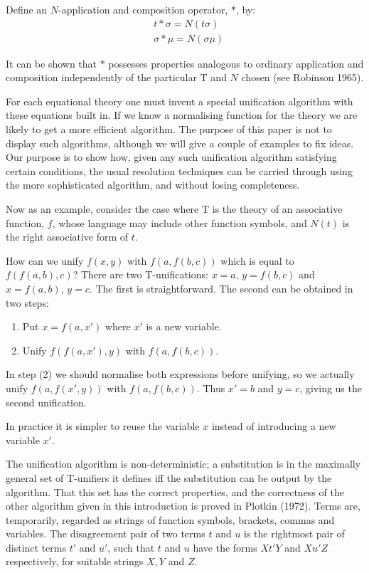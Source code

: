 \documentclass[letterpaper]{report}
\begin{document}
Define an $N$-application and composition operator, $\ast$, by:
\begin{align*}
&t\ast\sigma=N(t\sigma)\\
&\sigma\ast\mu=N(\sigma\mu)
\end{align*}

It can be shown that $\ast$ possesses properties analogous to ordinary
application and composition independently of the particular $\mathrm{T}$ and
$N$ chosen (see Robinson 1965).

For each equational theory one must invent a special unification
algorithm with these equations built in. If we know a normalising
function for the theory we are likely to get a more efficient algorithm.
The purpose of this paper is not to display such algorithms, although we
will give a couple of examples to fix ideas. Our purpose is to show how,
given any such unification algorithm satisfying certain conditions, the
usual resolution techniques can
be carried through using the more sophisticated algorithm, and without
losing completeness.

Now as an example, consider the case where $\mathrm{T}$ is the theory of an
associative function, $f$, whose language may include other function
symbols, and $N(t)$ is the right associative form of $t$.

How can we unify $f(x,y)$ with $f(a,f(b,c))$ which is equal to
$f(f(a,b),c)$? There are two $\mathrm{T}$-unifications: $x = a$, $y = f(b,c)$
and $x = f(a,b)$, $y = c$. The first is straightforward. The second
can be obtained in two steps:

\begin{enumerate}
	\def\labelenumi{(\arabic{enumi})}
	\item
	Put $x = f(a,x')$ where $x'$ is a new variable.
	\item
	Unify $f(f(a,x'),y)$ with $f(a,f(b,c))$.
\end{enumerate}

In step (2) we should normalise both expressions before unifying, so we
actually unify $f(a,f(x',y))$ with $f(a,f(b,c))$. Thus
$x' = b$ and $y = c$, giving us the second unification.

In practice it is simpler to reuse the variable $x$ instead of
introducing a new variable $x'$.

The unification algorithm is non-deterministic; a substitution is in the
maximally general set of $\mathrm{T}$-unifiers it defines iff the substitution
can be output by the algorithm. That this set has the correct
properties, and the correctness of the other algorithm given in this
introduction is proved in Plotkin (1972). Terms are, temporarily,
regarded as strings of function symbols, brackets, commas and variables.
The disagreement pair of two terms $t$ and $u$ is the rightmost pair
of distinct terms $t'$ and $u'$, such that $t$ and
$u$ have the forms $Xt'Y$ and $Xu'Z$ respectively,
for suitable strings $X, Y$ and $Z$.
\end{document}
